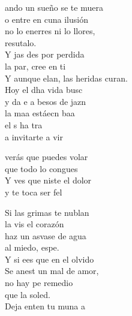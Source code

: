 \begin{cancion}%
	ando un sueño se te muera\\
	o entre en cuna ilusión\\
	no lo enerres ni lo llores, \\
	resutalo. \\
	Y jas des por perdida \\
	la par, cree en ti\\
	Y aunque elan, las heridas curan. \\
	Hoy el dha vida busc\\
	y  da e a besos de jazn \\
	la maa estáecn baa  \\
	el s  ha tra \\
	a invitarte a vir\\
	\begin{chorus}%
	verás que puedes volar\\
	que todo lo congues\\
	Y ves que niste el dolor \\
	y te toca ser fel\\
	\end{chorus}%
	Si las grimas te nublan \\
	la vis el corazón\\
	haz un asvase de agua\\
	al miedo, espe.\\
	Y si ees que en el olvido\\
	Se anest un mal de amor,\\
	no hay pe remedio\\
	que la soled.\\
	Deja enten tu muna a\\

\end{cancion}

